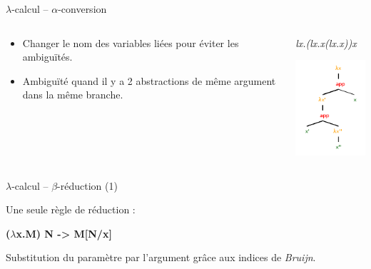 \documentclass{beamer}
\begin{document}
\begin{frame}{$\lambda$-calcul -- $\alpha$-conversion}

  \begin{columns}
    \begin{column}{5cm}
      \begin{itemize}
      \item Changer le nom des variables liées pour éviter les ambiguïtés.
      \item Ambiguïté quand il y a 2 abstractions de même argument dans la même branche.
      \end{itemize}
    \end{column}

    \begin{column}{5cm}
      \begin{center}
        \textit{lx.(lx.x(lx.x))x}

        \includegraphics{lambda3.png}
      \end{center}
    \end{column}
  \end{columns}

\end{frame}

\begin{frame}{$\lambda$-calcul -- $\beta$-réduction (1)}

  Une seule règle de réduction :

  \medskip

  \textbf{($\lambda$x.M) N  -> M[N/x]}

  \medskip

  Substitution du paramètre par l'argument grâce aux indices de \textit{Bruijn}.

\end{frame}
\end{document}
